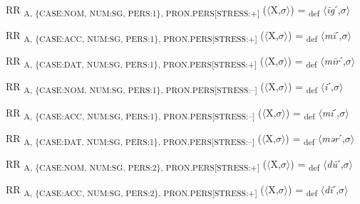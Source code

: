 {\begin{exe}
 RR \textsubscript{A, \{CASE:NOM, NUM:SG, PERS:1\}, PRON.PERS[STRESS:+]} ($\langle$X,$\sigma $$\rangle$) = \textsubscript{def} $\langle$\textit{\=ig}ˊ,$\sigma $$\rangle$
\end{exe}

\begin{exe}
 RR \textsubscript{A, \{CASE:ACC, NUM:SG, PERS:1\}, PRON.PERS[STRESS:+]} ($\langle$X,$\sigma $$\rangle$) = \textsubscript{def} $\langle$\textit{m\=i}ˊ,$\sigma $$\rangle$
\end{exe}

\begin{exe}
 RR \textsubscript{A, \{CASE:DAT, NUM:SG, PERS:1\}, PRON.PERS[STRESS:+]} ($\langle$X,$\sigma $$\rangle$) = \textsubscript{def} $\langle$\textit{m\=ir}ˊ,$\sigma $$\rangle$
\end{exe}

\begin{exe}
 RR \textsubscript{A, \{CASE:NOM, NUM:SG, PERS:1\}, PRON.PERS[STRESS:–]} ($\langle$X,$\sigma $$\rangle$) = \textsubscript{def} $\langle$\textit{i}ˊ,$\sigma $$\rangle$
\end{exe}

\begin{exe}
 RR \textsubscript{A, \{CASE:ACC, NUM:SG, PERS:1\}, PRON.PERS[STRESS:–]} ($\langle$X,$\sigma $$\rangle$) = \textsubscript{def} $\langle$\textit{mi}ˊ,$\sigma $$\rangle$
\end{exe}

\begin{exe}
 RR \textsubscript{A, \{CASE:DAT, NUM:SG, PERS:1\}, PRON.PERS[STRESS:–]} ($\langle$X,$\sigma $$\rangle$) = \textsubscript{def} $\langle$\textit{mər}ˊ,$\sigma $$\rangle$
\end{exe}

\begin{exe}
 RR \textsubscript{A, \{CASE:NOM, NUM:SG, PERS:2\}, PRON.PERS[STRESS:+]} ($\langle$X,$\sigma $$\rangle$) = \textsubscript{def} $\langle$\textit{d\=u}ˊ,$\sigma $$\rangle$
\end{exe}

\begin{exe}
 RR \textsubscript{A, \{CASE:ACC, NUM:SG, PERS:2\}, PRON.PERS[STRESS:+]} ($\langle$X,$\sigma $$\rangle$) = \textsubscript{def} $\langle$\textit{d\=i}ˊ,$\sigma $$\rangle$
\end{exe}

}

